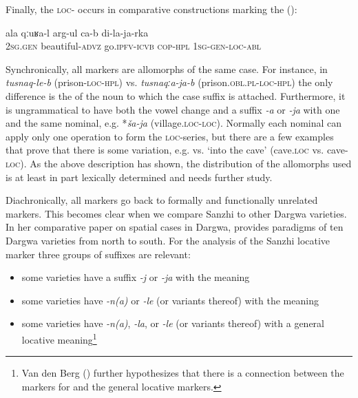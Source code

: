 Finally, the \textsc{loc}- occurs in comparative constructions  marking the  ():
%
\begin{exe}
	\ex	\label{ex:Yours (i.e. your story) is better than mine}
	\gll	ala	qːuʁa-l	arg-ul ca-b	di-la-ja-rka \\
		2\textsc{sg}.\textsc{gen}	beautiful-\textsc{advz}	go.\textsc{ipfv}-\textsc{icvb} \textsc{cop-hpl}	1\textsc{sg}-\textsc{gen}-\textsc{loc}-\textsc{abl}\\
	\glt	{}
\end{exe}


Synchronically, all markers are allomorphs of the same case. For instance, in \textit{tusnaq-le-b} (prison-\textsc{loc-hpl})  vs. \textit{tusnaqːa-ja-b} (prison.\textsc{obl.pl-loc-hpl})  the only difference is the  of the noun to which the case suffix is attached. Furthermore, it is ungrammatical to have both the vowel change and a suffix \textit{-a} or \textit{-ja} with one and the same nominal, e.g. *\textit{ša-ja} (village.\textsc{loc-loc}). Normally each nominal can apply only one operation to form the \textsc{loc}-series, but there are a few examples that prove that there is some variation, e.g.  vs.  `into the cave' (cave.\textsc{loc} vs. cave-\textsc{loc}). As the above description has shown, the distribution of the allomorphs used is at least in part lexically determined and needs further study.
 
Diachronically, all markers go back to formally and functionally unrelated markers. This becomes clear when we compare Sanzhi to other Dargwa varieties. In her comparative paper on spatial cases in Dargwa, \citet{vandenBerg2003c} provides  paradigms of ten Dargwa varieties from north to south. For the analysis of the Sanzhi locative marker three groups of suffixes are relevant:
%
\begin{itemize}
	\item some varieties have a suffix \textit{-j} or \textit{-ja} with the meaning 
	\item some varieties have \textit{-n(a)} or \textit{-le} (or variants thereof) with the meaning 
	\item some varieties have \textit{-n(a)}, \textit{-la}, or \textit{-le} (or variants thereof) with a general locative meaning\footnote{Van den Berg (\citeyear{vandenBerg2003c}) further hypothesizes that there is a connection between the markers for  and the general locative markers.} 
\end{itemize}

